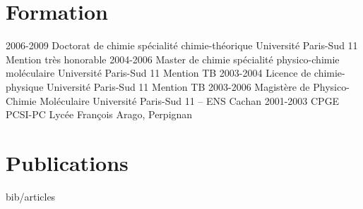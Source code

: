 \documentclass[french]{cv-style}      %
\begin{document}

\section{Formation}

\begin{entrylist}
\entry
{2006-2009}
{Doctorat de chimie {\normalfont spécialité chimie-théorique}}
{Université Paris-Sud 11}
{Mention très honorable}
\entry
{2004-2006}
{Master de chimie {\normalfont spécialité physico-chimie moléculaire}}
{Université Paris-Sud 11}
{Mention TB}
\entry
{2003-2004}
{Licence de chimie-physique}
{Université Paris-Sud 11}
{Mention TB}
\entry
{2003-2006}
{Magistère de Physico-Chimie Moléculaire}
{Université Paris-Sud 11 -- ENS Cachan}
{}
\entry
{2001-2003}
{CPGE {\normalfont PCSI-PC}}
{Lycée François Arago, Perpignan}
{}
\end{entrylist}


\section{Publications}

\nocite{vallverdu2016, guille2015, Guille2014, Martin2012, Maillet2011, Jonasson2011, Vallverdu2010, Vallverdu2009}
\begin{btSect}{bib/articles}
    \btPrintCited
\end{btSect}


%
\end{document}
